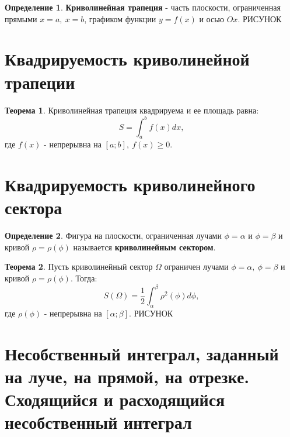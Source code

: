 \documentclass{report}
\theoremstyle{definition}
\newtheorem*{definition}{Определение}
\newtheorem*{theorem}{Теорема}
\begin{document}
\begin{definition}
    \textbf{Криволинейная трапеция} - часть плоскости, ограниченная прямыми $x=a, \ x=b$, графиком функции
    $y = f(x)$ и осью $Ox$. {\Large РИСУНОК}
\end{definition}

\section{Квадрируемость криволинейной трапеции}

\begin{theorem}
    Криволинейная трапеция квадрируема и ее площадь равна:
    \begin{equation*}
        S = \int_{a}^{b}f(x)dx,
    \end{equation*}
    где $f(x)$ - непрерывна на $[a;b], \ f(x) \geqslant 0$.
\end{theorem}

\section{Квадрируемость криволинейного сектора}

\begin{definition}
    Фигура на плоскости, ограниченная лучами $\phi = \alpha$ и $\phi = \beta$ и кривой $\rho = \rho(\phi)$
    называется \textbf{криволинейным сектором}.
\end{definition}

\begin{theorem}
    Пусть криволинейный сектор $\Omega$ ограничен лучами $\phi = \alpha, \ \phi = \beta$ и кривой $\rho
        = \rho(\phi)$. Тогда:
    \begin{equation*}
        S(\Omega) = \frac{1}{2}\int_{\alpha}^{\beta}\rho^2(\phi)d\phi,
    \end{equation*}
    где $\rho(\phi)$ - непрерывна на $[\alpha;\beta]$. {\Large РИСУНОК}
\end{theorem}

\section{Несобственный интеграл, заданный на луче, на прямой, на отрезке.
  Сходящийся и расходящийся несобственный интеграл}
\end{document}
